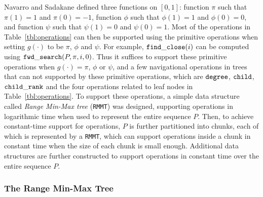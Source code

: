 Navarro and Sadakane defined three functions on $[0,1]$: function $\pi$ such that $\pi(1) = 1$ and $\pi(0) = -1$, function $\phi$ such that $\phi(1) = 1$ and $\phi(0) = 0$, and function $\psi$ such that $\psi(1) = 0$ and $\psi(0) = 1$. 
Most of the operations in Table~\ref{tbl:operations} can then be supported using the primitive operations when setting $g(\cdot)$ to be $\pi$, $\phi$ and $\psi$. For example, $\mathtt{find\_close}(i)$ can be computed using $\mathtt{fwd\_search}(P,\pi,i,0)$. 
Thus it suffices to support these primitive operations when $g(\cdot) = \pi$, $\phi$ or $\psi$, and a few  navigational operations in trees that can not supported by these primitive operations, which are $\mathtt{degree}$, $\mathtt{child}$, $\mathtt{child\_rank}$ and the four operations related to leaf nodes in Table~\ref{tbl:operations}. 
To support these operations, a simple data structure called \emph{Range Min-Max tree} ({\tt RMMT}) was designed, supporting operations in logarithmic time when used to represent the entire sequence $P$. 
Then, to achieve constant-time support for operations, $P$ is further partitioned into chunks, each of which is represented by a {\tt RMMT}, which can support operations inside a chunk in constant time when the size of each chunk is small enough. Additional data structures are further constructed to support operations in constant time over the entire sequence $P$. 

\subsubsection{The Range Min-Max Tree}

